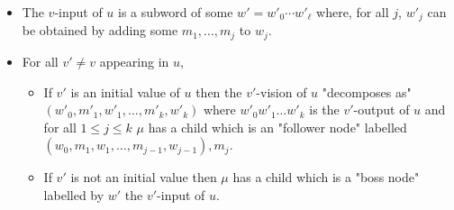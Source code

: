 \begin{definition}
\begin{itemize}
		\item The $v$-input of $u$ is a subword of some $w' = w'_0\cdots w'_\ell$ where, for all $j$, $w'_j$ can be obtained by adding some $m_1, \ldots, m_{j}$ to $w_j$.
		
		\item For all $v' \neq v$ appearing in $u$,
		\begin{itemize}
			\item If $v'$ is an initial value of $u$ then the $v'$-vision of $u$ "decomposes as"  $(w'_0, m'_1, w'_1, \ldots, m'_k, w'_k)$ where $w'_0 w'_1 \ldots w'_k$ is the $v'$-output of $u$ and for all $1 \leq j \leq k$ $\mu$ has a child which is an "follower node" labelled $(w_0, m_1, w_1, \ldots, m_{j-1}, w_{j-1}), m_j$.  
			
			\item If $v'$ is not an initial value then $\mu$ has a child which is a "boss node" labelled by $w'$ the $v'$-input of $u$.
		\end{itemize}
	\end{itemize}
\end{definition}



%	
%		

